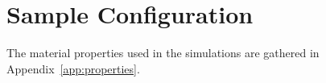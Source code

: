 \section{Sample Configuration}
\label{sec:sample}


The material properties used in the simulations are gathered in Appendix~\ref{app:properties}.

